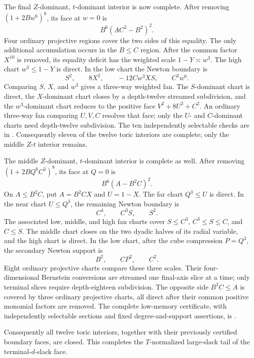 \documentclass[11pt]{article}
\theoremstyle{remark}
\begin{document}
The final \(Z\)-dominant, \(t\)-dominant interior is now complete.  After
removing \((1+2Bw^6)^8\), its face at \(w=0\) is
\[
                         B^6(AC^2-B^2)^2.
\]
Four ordinary projective regions cover the two sides of this equality.  The
only additional accumulation occurs in the \(B\leq C\) region.  After the
common factor \(X^{10}\) is removed, its equality deficit has the weighted
scale \(1-Y\asymp w^3\).  The high chart \(w^3\leq1-Y\) is direct.  In the
low chart the Newton boundary is
\[
 S^2,\qquad 8X^2,\qquad -12Cw^3XS,\qquad C^2w^6.
\]
Comparing \(S\), \(X\), and \(w^3\) gives a three-way weighted fan.  The
\(S\)-dominant chart is direct, the \(X\)-dominant chart closes by a
depth-twelve streamed subdivision, and the \(w^3\)-dominant chart reduces
to the positive face \(V^2+8U^2+C^2\).  An ordinary three-way fan comparing
\(U,V,C\) resolves that face; only the \(U\)- and \(C\)-dominant charts need
depth-twelve subdivision.  The ten independently selectable checks are in
.  Consequently eleven
of the twelve toric interiors are complete; only the middle \(Z\)-\(t\)
interior remains.

The middle \(Z\)-dominant, \(t\)-dominant interior is complete as well.
After removing \((1+2BQ^6C^3)^8\), its face at \(Q=0\) is
\[
                         B^6(A-B^2C)^2.
\]
On \(A\leq B^2C\), put \(A=B^2CX\) and \(U=1-X\).  The far chart
\(Q^3\leq U\) is direct.  In the near chart \(U\leq Q^3\), the remaining
Newton boundary is
\[
                         C^4,\qquad C^3S,\qquad S^2.
\]
The associated low, middle, and high fan charts cover \(S\leq C^3\),
\(C^3\leq S\leq C\), and \(C\leq S\).  The middle chart closes on the two
dyadic halves of its radial variable, and the high chart is direct.  In the
low chart, after the cube compression \(P=Q^3\), the secondary Newton
support is
\[
                         B^2,\qquad CP^2,\qquad C^2.
\]
Eight ordinary projective charts compare these three scales.  Their
four-dimensional Bernstein conversions are streamed one final-axis slice
at a time; only terminal slices require depth-eighteen subdivision.  The
opposite side \(B^2C\leq A\) is covered by three ordinary projective charts,
all direct after their common positive monomial factors are removed.  The
complete low-memory certificate, with independently selectable sections
and fixed degree-and-support assertions, is
.

Consequently all twelve toric interiors, together with their previously
certified boundary faces, are closed.  This completes the \(T\)-normalized
large-slack tail of the terminal-\(d\)-slack face.
\end{document}
